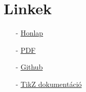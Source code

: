 \chapter{Linkek}

\begin{enumerate}
    \item[-] \href{./index.html}{Honlap}
    \item[-] \href{./mainpage.pdf}{PDF}
    \item[-] \href{https://github.com/a-gondolkodas-orome/latex-tutorial}{Github} 
    \item[-] \href{https://ctan.ijs.si/tex-archive/graphics/pgf/base/doc/pgfmanual.pdf}{TikZ dokumentáció} 
\end{enumerate}
        

